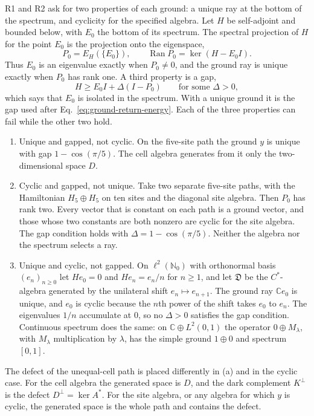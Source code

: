 \documentclass[11pt]{article}
\theoremstyle{definition}
\DeclareMathOperator{\Ran}{Ran}
\newcommand{\C}{\mathbb C}
\begin{document}
R1 and R2 ask for two properties of each ground: a unique ray at the bottom of the spectrum, and cyclicity for the specified algebra. Let $H$ be self-adjoint and bounded below, with $E_0$ the bottom of its spectrum. The spectral projection of $H$ for the point $E_0$ is the projection onto the eigenspace,
\begin{equation}
 P_0=E_H(\{E_0\}),\qquad \Ran P_0=\ker(H-E_0I) .
 \label{eq:ground-spectral-projection}
\end{equation}
Thus $E_0$ is an eigenvalue exactly when $P_0\ne0$, and the ground ray is unique exactly when $P_0$ has rank one. A third property is a gap,
\begin{equation}
 H\geq E_0I+\Delta(I-P_0)\qquad\text{for some }\Delta>0 ,
 \label{eq:ground-gap-condition}
\end{equation}
which says that $E_0$ is isolated in the spectrum. With a unique ground it is the gap used after Eq.~\eqref{eq:ground-return-energy}. Each of the three properties can fail while the other two hold.
\begin{enumerate}
\item[(a)] Unique and gapped, not cyclic. On the five-site path the ground $y$ is unique with gap $1-\cos(\pi/5)$. The cell algebra generates from it only the two-dimensional space $D$.
\item[(b)] Cyclic and gapped, not unique. Take two separate five-site paths, with the Hamiltonian $H_5\oplus H_5$ on ten sites and the diagonal site algebra. Then $P_0$ has rank two. Every vector that is constant on each path is a ground vector, and those whose two constants are both nonzero are cyclic for the site algebra. The gap condition holds with $\Delta=1-\cos(\pi/5)$. Neither the algebra nor the spectrum selects a ray.
\item[(c)] Unique and cyclic, not gapped. On $\ell^2(\mathbb N_0)$ with orthonormal basis $(e_n)_{n\geq0}$ let $He_0=0$ and $He_n=e_n/n$ for $n\geq1$, and let $\mathfrak D$ be the $C^*$-algebra generated by the unilateral shift $e_n\mapsto e_{n+1}$. The ground ray $\C e_0$ is unique, and $e_0$ is cyclic because the $n$th power of the shift takes $e_0$ to $e_n$. The eigenvalues $1/n$ accumulate at $0$, so no $\Delta>0$ satisfies the gap condition. Continuous spectrum does the same: on $\C\oplus L^2(0,1)$ the operator $0\oplus M_\lambda$, with $M_\lambda$ multiplication by $\lambda$, has the simple ground $1\oplus0$ and spectrum $[0,1]$.
\end{enumerate}
The defect of the unequal-cell path is placed differently in (a) and in the cyclic case. For the cell algebra the generated space is $D$, and the dark complement $K^\perp$ is the defect $D^\perp=\ker A^*$. For the site algebra, or any algebra for which $y$ is cyclic, the generated space is the whole path and contains the defect.
\end{document}
